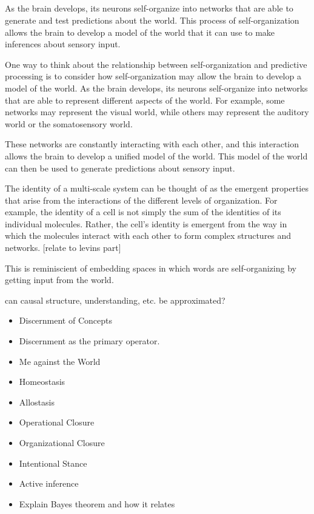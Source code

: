 \subsection{} \cite{friston_world_2021}
As the brain develops, its neurons self-organize into networks that are able to generate and test predictions about the world. This process of self-organization allows the brain to develop a model of the world that it can use to make inferences about sensory input.

One way to think about the relationship between self-organization and predictive processing is to consider how self-organization may allow the brain to develop a model of the world. As the brain develops, its neurons self-organize into networks that are able to represent different aspects of the world. For example, some networks may represent the visual world, while others may represent the auditory world or the somatosensory world.

These networks are constantly interacting with each other, and this interaction allows the brain to develop a unified model of the world. This model of the world can then be used to generate predictions about sensory input.

The identity of a multi-scale system can be thought of as the emergent properties that arise from the interactions of the different levels of organization. For example, the identity of a cell is not simply the sum of the identities of its individual molecules. Rather, the cell's identity is emergent from the way in which the molecules interact with each other to form complex structures and networks. [relate to levins part]

This is reminiscient of embedding spaces in which words are self-organizing by getting input from the world. 

can causal structure, understanding, etc. be approximated?


\begin{itemize}
    \item Discernment of Concepts
    \item Discernment as the primary operator. 
    \item Me against the World
    \item Homeostasis
    \item Allostasis
    \item Operational Closure
    \item Organizational Closure
    \item Intentional Stance
    \item Active inference
    \item Explain Bayes theorem and how it relates 
\end{itemize}





